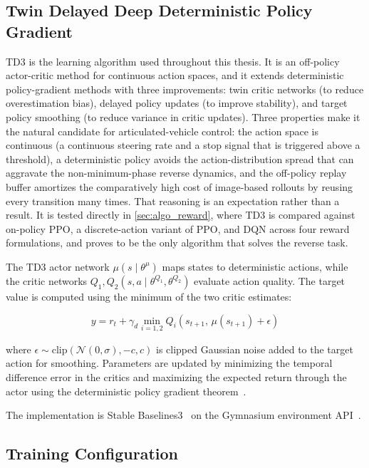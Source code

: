 \subsection{Twin Delayed Deep Deterministic Policy Gradient}
\label{sec:td3}

TD3 is the learning algorithm used throughout this thesis. It is an off-policy actor-critic method for continuous action spaces, and it extends deterministic policy-gradient methods with three improvements: twin critic networks (to reduce overestimation bias), delayed policy updates (to improve stability), and target policy smoothing (to reduce variance in critic updates). Three properties make it the natural candidate for articulated-vehicle control: the action space is continuous (a continuous steering rate and a stop signal that is triggered above a threshold), a deterministic policy avoids the action-distribution spread that can aggravate the non-minimum-phase reverse dynamics, and the off-policy replay buffer amortizes the comparatively high cost of image-based rollouts by reusing every transition many times. That reasoning is an expectation rather than a result. It is tested directly in \cref{sec:algo_reward}, where TD3 is compared against on-policy PPO, a discrete-action variant of PPO, and DQN across four reward formulations, and proves to be the only algorithm that solves the reverse task.

The TD3 actor network $\mu(s \mid \theta^\mu)$ maps states to deterministic actions, while the critic networks $Q_1, Q_2(s, a \mid \theta^{Q_1}, \theta^{Q_2})$ evaluate action quality. The target value is computed using the minimum of the two critic estimates:

\begin{equation}
    y = r_t + \gamma_d \min_{i=1,2} Q_i(s_{t+1},\, \mu(s_{t+1}) + \epsilon)
    \label{eq:td3_target}
\end{equation}

where $\epsilon \sim \text{clip}(\mathcal{N}(0, \sigma), -c, c)$ is clipped Gaussian noise added to the target action for smoothing. Parameters are updated by minimizing the temporal difference error in the critics and maximizing the expected return through the actor using the deterministic policy gradient theorem~\cite{silver2014dpg}.

The implementation is Stable Baselines3~\cite{raffin2021sb3} on the Gymnasium environment API~\cite{towers2024gymnasium}.

\subsection{Training Configuration}
\label{sec:hpo}

